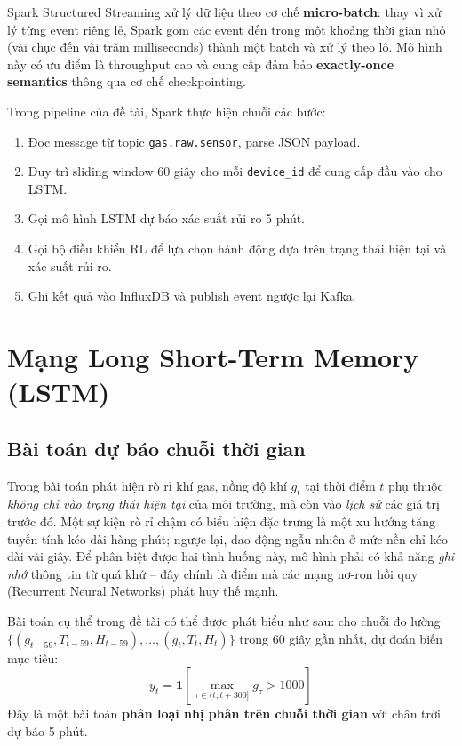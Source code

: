Spark Structured Streaming xử lý dữ liệu theo cơ chế \textbf{micro-batch}: thay vì xử lý từng event riêng lẻ, Spark gom các event đến trong một khoảng thời gian nhỏ (vài chục đến vài trăm milliseconds) thành một batch và xử lý theo lô. Mô hình này có ưu điểm là throughput cao và cung cấp đảm bảo \textbf{exactly-once semantics} thông qua cơ chế checkpointing.

Trong pipeline của đề tài, Spark thực hiện chuỗi các bước:
\begin{enumerate}
  \item Đọc message từ topic \texttt{gas.raw.sensor}, parse JSON payload.
  \item Duy trì sliding window 60 giây cho mỗi \texttt{device\_id} để cung cấp đầu vào cho LSTM.
  \item Gọi mô hình LSTM dự báo xác suất rủi ro 5 phút.
  \item Gọi bộ điều khiển RL để lựa chọn hành động dựa trên trạng thái hiện tại và xác suất rủi ro.
  \item Ghi kết quả vào InfluxDB và publish event ngược lại Kafka.
\end{enumerate}

\section{Mạng Long Short-Term Memory (LSTM)}

\subsection{Bài toán dự báo chuỗi thời gian}

Trong bài toán phát hiện rò rỉ khí gas, nồng độ khí $g_t$ tại thời điểm $t$ phụ thuộc \textit{không chỉ vào trạng thái hiện tại} của môi trường, mà còn vào \textit{lịch sử} các giá trị trước đó. Một sự kiện rò rỉ chậm có biểu hiện đặc trưng là một xu hướng tăng tuyến tính kéo dài hàng phút; ngược lại, dao động ngẫu nhiên ở mức nền chỉ kéo dài vài giây. Để phân biệt được hai tình huống này, mô hình phải có khả năng \textit{ghi nhớ} thông tin từ quá khứ – đây chính là điểm mà các mạng nơ-ron hồi quy (Recurrent Neural Networks) phát huy thế mạnh.

Bài toán cụ thể trong đề tài có thể được phát biểu như sau: cho chuỗi đo lường $\{(g_{t-59}, T_{t-59}, H_{t-59}), \ldots, (g_t, T_t, H_t)\}$ trong 60 giây gần nhất, dự đoán biến mục tiêu:
\begin{equation}
  y_t = \mathbf{1}\left[\max_{\tau \in (t, t+300]} g_\tau > 1000\right]
\end{equation}
Đây là một bài toán \textbf{phân loại nhị phân trên chuỗi thời gian} với chân trời dự báo 5 phút.

